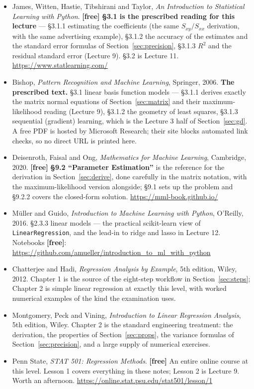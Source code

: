 \documentclass[11pt]{article}
\begin{document}
\begin{itemize}[leftmargin=*]
  \item James, Witten, Hastie, Tibshirani and Taylor, \emph{An Introduction to
    Statistical Learning with Python}. \textbf{[free]} \textbf{\S3.1 is the
    prescribed reading for this lecture} --- \S3.1.1 estimating the
    coefficients (the same $S_{xy}/S_{xx}$ derivation, with the same
    advertising example), \S3.1.2 the accuracy of the estimates and the
    standard error formulas of Section~\ref{sec:precision}, \S3.1.3 $R^2$ and
    the residual standard error (Lecture 9). \S3.2 is Lecture 11.
    \url{https://www.statlearning.com/}
  \item Bishop, \emph{Pattern Recognition and Machine Learning}, Springer,
    2006. \textbf{The prescribed text.} \S3.1 linear basis function models ---
    \S3.1.1 derives exactly the matrix normal equations of
    Section~\ref{sec:matrix} and their maximum-likelihood reading (Lecture 9),
    \S3.1.2 the geometry of least squares, \S3.1.3 sequential (gradient)
    learning, which is the Lecture 3 half of Section~\ref{sec:gd}. A free PDF
    is hosted by Microsoft Research; their site blocks automated link checks,
    so no direct URL is printed here.
  \item Deisenroth, Faisal and Ong, \emph{Mathematics for Machine Learning},
    Cambridge, 2020. \textbf{[free]} \textbf{\S9.2 ``Parameter Estimation''}
    is the reference for the derivation in Section~\ref{sec:derive}, done
    carefully in the matrix notation, with the maximum-likelihood version
    alongside; \S9.1 sets up the problem and \S9.2.2 covers the closed-form
    solution. \url{https://mml-book.github.io/}
  \item M\"uller and Guido, \emph{Introduction to Machine Learning with
    Python}, O'Reilly, 2016. \S2.3.3 linear models --- the practical
    scikit-learn view of \texttt{LinearRegression}, and the lead-in to ridge
    and lasso in Lecture 12. Notebooks \textbf{[free]}:
    \url{https://github.com/amueller/introduction_to_ml_with_python}
  \item Chatterjee and Hadi, \emph{Regression Analysis by Example}, 5th
    edition, Wiley, 2012. Chapter 1 is the source of the eight-step workflow
    in Section~\ref{sec:steps}; Chapter 2 is simple linear regression at
    exactly this level, with worked numerical examples of the kind the
    examination uses.
  \item Montgomery, Peck and Vining, \emph{Introduction to Linear Regression
    Analysis}, 5th edition, Wiley. Chapter 2 is the standard engineering
    treatment: the derivation, the properties of Section~\ref{sec:props}, the
    variance formulas of Section~\ref{sec:precision}, and a large supply of
    numerical exercises.
  \item Penn State, \emph{STAT 501: Regression Methods}. \textbf{[free]} An
    entire online course at this level. Lesson 1 covers everything in these
    notes; Lesson 2 is Lecture 9. Worth an afternoon.
    \url{https://online.stat.psu.edu/stat501/lesson/1}
\end{itemize}
\end{document}
